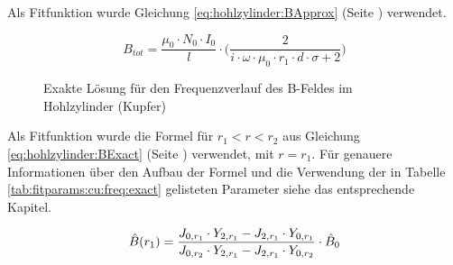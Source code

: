 \begin{minipage}[t][][t]{0.43\textwidth}
    
\end{minipage}
\begin{minipage}[t][][t]{0.56\textwidth}

    Als  Fitfunktion  wurde   Gleichung  \ref{eq:hohlzylinder:BApprox}  (Seite
    \pageref{eq:hohlzylinder:BApprox}) verwendet.

    \begin{equation*}
        B_{tot} = \frac{\mu_0 \cdot N_0 \cdot I_0}{l} \cdot \Biggl( \frac{2}{i \cdot \omega \cdot \mu_0 \cdot r_1 \cdot d \cdot \sigma + 2} \Biggr)
    \end{equation*}

\end{minipage}

\begin{figure}[h!]
    \resizebox{\textwidth}{!}{}
    \caption{Exakte L\"osung f\"ur den Frequenzverlauf des B-Feldes im Hohlzylinder (Kupfer)}
    \label{fig:cu:freq:exact}
\end{figure}

\begin{minipage}[t][][t]{0.43\textwidth}
    
\end{minipage}
\begin{minipage}[t][][t]{0.56\textwidth}

    Als  Fitfunktion   wurde  die  Formel  f\"ur   $r_1<r<r_2$  aus  Gleichung
    \ref{eq:hohlzylinder:BExact}    (Seite   \pageref{eq:hohlzylinder:BExact})
    verwendet,   mit   $r   =  r_1$. F\"ur   genauere   Informationen   \"uber
    den   Aufbau   der   Formel   und    die   Verwendung   der   in   Tabelle
    \ref{tab:fitparams:cu:freq:exact}    gelisteten   Parameter    siehe   das
    entsprechende Kapitel.

    \begin{equation*}
        \hat{B} (r_1) = \frac{J_{0,r_1} \cdot Y_{2,r_1} - J_{2,r_1} \cdot Y_{0,r_1}}{J_{0,r_2} \cdot Y_{2,r_1} - J_{2,r_1} \cdot Y_{0,r_2}} \cdot \hat{B}_0 \\
    \end{equation*}
\end{minipage}

